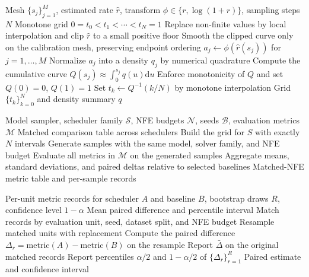 \documentclass{article}
\newcommand{\dd}{\mathrm{d}}
\theoremstyle{plain}
\theoremstyle{definition}
\theoremstyle{remark}
\begin{document}
\begin{algorithm}[H]
  \caption{Rate Postprocessing and Grid Construction}
  \label{alg:grid}
  \begin{algorithmic}[1]
    \REQUIRE Mesh $\{s_j\}_{j=1}^M$, estimated rate $\hat r$, transform $\phi\in\{r,\log(1+r)\}$, sampling steps $N$
    \ENSURE Monotone grid $0=t_0<t_1<\cdots<t_N=1$
    \STATE Replace non-finite values by local interpolation and clip $\hat r$ to a small positive floor
    \STATE Smooth the clipped curve only on the calibration mesh, preserving endpoint ordering
    \STATE $a_j\leftarrow \phi(\hat r(s_j))$ for $j=1,\ldots,M$
    \STATE Normalize $a_j$ into a density $q_j$ by numerical quadrature
    \STATE Compute the cumulative curve $Q(s_j)\approx\int_0^{s_j}q(u)\dd u$
    \STATE Enforce monotonicity of $Q$ and set $Q(0)=0$, $Q(1)=1$
      \STATE Set $t_k\leftarrow Q^{-1}(k/N)$ by monotone interpolation
    \ENDFOR
    \RETURN Grid $\{t_k\}_{k=0}^N$ and density summary $q$
  \end{algorithmic}
\end{algorithm}

\begin{algorithm}[H]
  \caption{Matched-NFE Evaluation Protocol}
  \label{alg:evaluation}
  \begin{algorithmic}[1]
    \REQUIRE Model sampler, scheduler family $\mathcal{S}$, NFE budgets $\mathcal{N}$, seeds $\mathcal{B}$, evaluation metrics $\mathcal{M}$
    \ENSURE Matched comparison table across schedulers
        \STATE Build the grid for $S$ with exactly $N$ intervals
          \STATE Generate samples with the same model, solver family, and NFE budget
          \STATE Evaluate all metrics in $\mathcal{M}$ on the generated samples
        \ENDFOR
      \ENDFOR
    \ENDFOR
    \STATE Aggregate means, standard deviations, and paired deltas relative to selected baselines
    \RETURN Matched-NFE metric table and per-sample records
  \end{algorithmic}
\end{algorithm}

\begin{algorithm}[H]
  \caption{Paired Bootstrap Confidence Intervals}
  \label{alg:bootstrap}
  \begin{algorithmic}[1]
    \REQUIRE Per-unit metric records for scheduler $A$ and baseline $B$, bootstrap draws $R$, confidence level $1-\alpha$
    \ENSURE Mean paired difference and percentile interval
    \STATE Match records by evaluation unit, seed, dataset split, and NFE budget
      \STATE Resample matched units with replacement
      \STATE Compute the paired difference $\Delta_r=\mathrm{metric}(A)-\mathrm{metric}(B)$ on the resample
    \ENDFOR
    \STATE Report $\bar{\Delta}$ on the original matched records
    \STATE Report percentiles $\alpha/2$ and $1-\alpha/2$ of $\{\Delta_r\}_{r=1}^R$
    \RETURN Paired estimate and confidence interval
  \end{algorithmic}
\end{algorithm}
\end{document}
